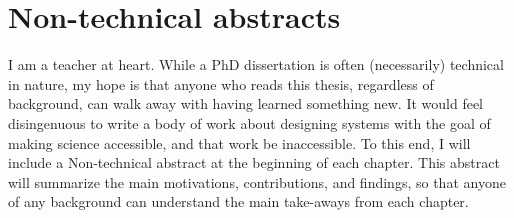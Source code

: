 \section{Non-technical abstracts}

I am a teacher at heart. While a PhD dissertation is often (necessarily) technical in nature, my hope is that anyone who reads this thesis, regardless of background, can walk away with having learned something new. It would feel disingenuous to write a body of work about designing systems with the goal of making science accessible, and that work be inaccessible. To this end, I will include a Non-technical abstract at the beginning of each chapter. This abstract will summarize the main motivations, contributions, and findings, so that anyone of any background can understand the main take-aways from each chapter.